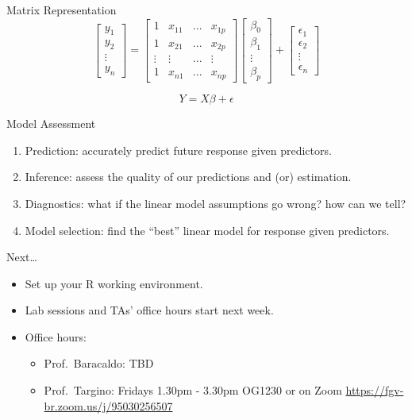 \documentclass[
  ignorenonframetext,
]{beamer}
\providecommand{\tightlist}{%
  \setlength{\itemsep}{0pt}\setlength{\parskip}{0pt}}
\begin{document}
\begin{frame}{Matrix Representation}
\protect\hypertarget{matrix-representation}{}
\[\begin{bmatrix}
           y_{1} \\
           y_{2} \\
           \vdots \\
           y_{n}
         \end{bmatrix}  = \begin{bmatrix}
           1& x_{11} &...&x_{1p}\\
           1& x_{21} &...&x_{2p} \\
           \vdots &\vdots& ...&\vdots\\
           1& x_{n1} &...&x_{np}
         \end{bmatrix}  \begin{bmatrix}
           \beta_{0} \\
           \beta_{1} \\
           \vdots \\
           \beta_{p}
         \end{bmatrix} +  \begin{bmatrix}
           \epsilon_{1} \\
           \epsilon_{2} \\
           \vdots \\
           \epsilon_{n}
         \end{bmatrix}\]

\[ Y = X\beta + \epsilon\]
\end{frame}

\begin{frame}{Model Assessment}
\protect\hypertarget{model-assessment}{}
\begin{enumerate}
\tightlist
\item
  Prediction: accurately predict future response given predictors.
\item
  Inference: assess the quality of our predictions and (or) estimation.
\item
  Diagnostics: what if the linear model assumptions go wrong? how can we
  tell?
\item
  Model selection: find the ``best'' linear model for response given
  predictors.
\end{enumerate}
\end{frame}

\begin{frame}{Next\ldots{}}
\protect\hypertarget{next}{}
\begin{itemize}
\tightlist
\item
  Set up your R working environment.
\item
  Lab sessions and TAs' office hours start next week.
\item
  Office hours:

  \begin{itemize}
  \tightlist
  \item
    Prof.~Baracaldo: TBD
  \item
    Prof.~Targino: Fridays 1.30pm - 3.30pm OG1230 or on Zoom
    \url{https://fgv-br.zoom.us/j/95030256507}
  \end{itemize}
\end{itemize}
\end{frame}
\end{document}
